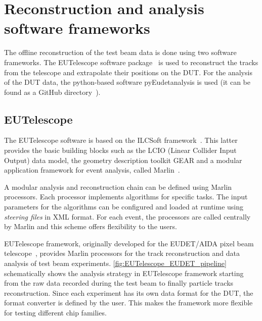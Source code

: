 
\section{Reconstruction and analysis software frameworks}
\label{sec:recoSoft}

The offline reconstruction of the test beam data is done using two
software frameworks. The EUTelescope software
package~\cite{Rubinskiy,EutelescopeWebsite} is used to reconstruct the
tracks from the telescope and extrapolate their positions on the
DUT. For the analysis of the DUT data, the python-based software
pyEudetanalysis is used (it can be found as a GitHub
directory~\cite{pyeudet}).

\subsection{EUTelescope}
The EUTelescope software is based on the ILCSoft
framework~\cite{Aplin:2009zz}. This latter provides the basic building
blocks such as the LCIO (Linear Collider Input Output) data model, the
geometry description toolkit GEAR and a modular application framework
for event analysis, called Marlin~\cite{Gaede:2006pj}.

A modular analysis and reconstruction chain can be defined using
Marlin processors. Each processor implements algorithms for specific
tasks. The input parameters for the algorithms can be configured and
loaded at runtime using \textit{steering files} in XML format. For
each event, the processors are called centrally by Marlin and this
scheme offers flexibility to the users.

EUTelescope framework, originally developed for the EUDET/AIDA pixel
beam telescope~\cite{Rubinskiy:2014kza}, provides Marlin processors
for the track reconstruction and data analysis of test beam
experiments. \cref{fig:EUTelescope_EUDET_pipeline} schematically shows
the analysis strategy in EUTelescope framework starting from the raw
data recorded during the test beam to finally particle tracks
reconstruction. Since each experiment has its own data format for the
DUT, the format converter is defined by the user. This makes the
framework more flexible for testing different chip families.

